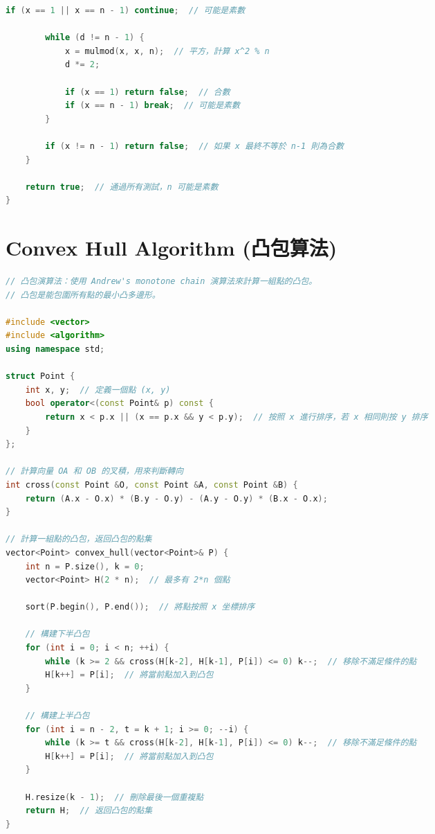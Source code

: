 \documentclass{article}
\begin{document}
\begin{multicols}{2}
\begin{lstlisting}[language=C++]
        if (x == 1 || x == n - 1) continue;  // 可能是素數

        while (d != n - 1) {
            x = mulmod(x, x, n);  // 平方，計算 x^2 % n
            d *= 2;

            if (x == 1) return false;  // 合數
            if (x == n - 1) break;  // 可能是素數
        }

        if (x != n - 1) return false;  // 如果 x 最終不等於 n-1 則為合數
    }

    return true;  // 通過所有測試，n 可能是素數
}
\end{lstlisting}

\section{Convex Hull Algorithm (凸包算法)}

\begin{lstlisting}[language=C++]
// 凸包演算法：使用 Andrew's monotone chain 演算法來計算一組點的凸包。
// 凸包是能包圍所有點的最小凸多邊形。

#include <vector>
#include <algorithm>
using namespace std;

struct Point {
    int x, y;  // 定義一個點 (x, y)
    bool operator<(const Point& p) const {
        return x < p.x || (x == p.x && y < p.y);  // 按照 x 進行排序，若 x 相同則按 y 排序
    }
};

// 計算向量 OA 和 OB 的叉積，用來判斷轉向
int cross(const Point &O, const Point &A, const Point &B) {
    return (A.x - O.x) * (B.y - O.y) - (A.y - O.y) * (B.x - O.x);
}

// 計算一組點的凸包，返回凸包的點集
vector<Point> convex_hull(vector<Point>& P) {
    int n = P.size(), k = 0;
    vector<Point> H(2 * n);  // 最多有 2*n 個點

    sort(P.begin(), P.end());  // 將點按照 x 坐標排序

    // 構建下半凸包
    for (int i = 0; i < n; ++i) {
        while (k >= 2 && cross(H[k-2], H[k-1], P[i]) <= 0) k--;  // 移除不滿足條件的點
        H[k++] = P[i];  // 將當前點加入到凸包
    }

    // 構建上半凸包
    for (int i = n - 2, t = k + 1; i >= 0; --i) {
        while (k >= t && cross(H[k-2], H[k-1], P[i]) <= 0) k--;  // 移除不滿足條件的點
        H[k++] = P[i];  // 將當前點加入到凸包
    }

    H.resize(k - 1);  // 刪除最後一個重複點
    return H;  // 返回凸包的點集
}
\end{lstlisting}


\end{multicols}
\end{document}
